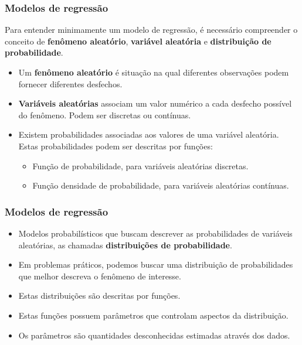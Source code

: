 \documentclass[10pt,
  aspectratio=169,
  serif,
  mathserif,
  professionalfont,
  compress,
  handout,
  ]{beamer}\usepackage[]{graphicx}\usepackage[]{color}
\begin{document}
\begin{frame}
  \frametitle{Modelos de regressão}

  Para entender minimamente um modelo de regressão, é necessário compreender o
  conceito de \textbf{fenômeno aleatório}, \textbf{variável aleatória} e \textbf{distribuição de probabilidade}.

  \begin{itemize}
    \itemsep 2ex

  \item Um \textbf{fenômeno aleatório} é situação na qual diferentes observações podem fornecer diferentes desfechos. 
  
  \item \textbf{Variáveis aleatórias} associam um valor numérico a cada desfecho possível do fenômeno. Podem ser discretas ou contínuas.
  
  \item Existem probabilidades associadas aos valores de uma variável aleatória. Estas probabilidades podem ser descritas por funções:
  
  \begin{itemize}
    \item Função de probabilidade, para variáveis aleatórias discretas.
    \item Função densidade de probabilidade, para variáveis aleatórias contínuas.
  \end{itemize}

  \end{itemize}
\end{frame}


\begin{frame}
  
  \frametitle{Modelos de regressão}

  \begin{itemize}
    \itemsep 2ex

  \item Modelos probabilísticos que buscam descrever as probabilidades de variáveis aleatórias, as chamadas \textbf{distribuições de probabilidade}.
  
  \item Em problemas práticos, podemos buscar uma distribuição de probabilidades que melhor descreva o fenômeno de interesse. 
  
  \item Estas distribuições são descritas por funções. 
  
  \item Estas funções possuem parâmetros que controlam aspectos da distribuição.
  
  \item Os parâmetros são quantidades desconhecidas estimadas através dos dados.
  
  \end{itemize}

\end{frame}
\end{document}
